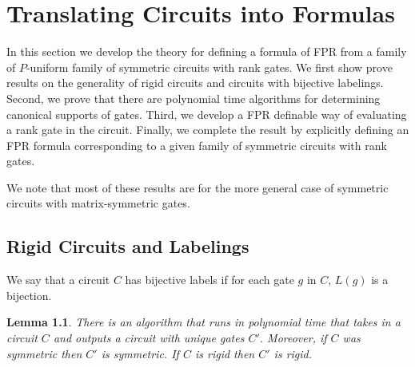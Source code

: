 \documentclass[12pt]{report}
\newtheorem{lem}[thm]{Lemma} \newtheorem{prop}[thm]{Proposition}
\begin{document}
\chapter{Translating Circuits into Formulas}
In this section we develop the theory for defining a formula of FPR from a
family of $P$-uniform family of symmetric circuits with rank gates. We first
show prove results on the generality of rigid circuits and circuits with
bijective labelings. Second, we prove that there are polynomial time algorithms
for determining canonical supports of gates. Third, we develop a FPR definable
way of evaluating a rank gate in the circuit. Finally, we complete the result by
explicitly defining an FPR formula corresponding to a given family of symmetric
circuits with rank gates.

We note that most of these results are for the more general case of symmetric
circuits with matrix-symmetric gates.

\section{Rigid Circuits and Labelings}


\begin{definition}
  We say that a circuit $C$ has bijective labels if for each gate $g$ in $C$,
  $L(g)$ is a bijection.
\end{definition}

\begin{lem}
  \label{lem:bij_labels}
  There is an algorithm that runs in polynomial time that takes in a circuit $C$
  and outputs a circuit with unique gates $C'$. Moreover, if $C$ was symmetric
  then $C'$ is symmetric. If $C$ is rigid then $C'$ is rigid.
\end{lem}
\end{document}

